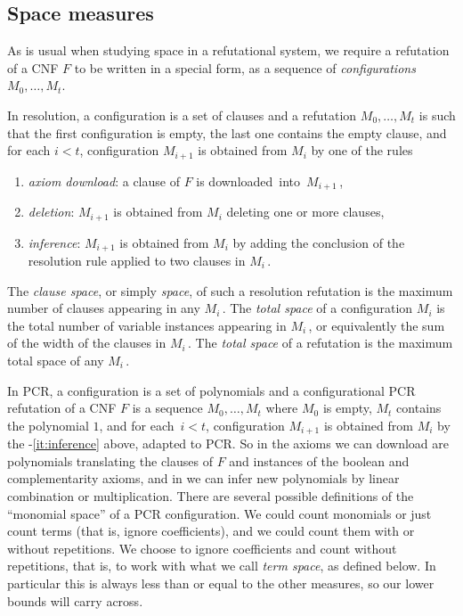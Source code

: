 \subsection{Space measures} \label{sec:space_intro}
As is usual when studying space in a refutational system, we require a  refutation of a CNF $F$  to be 
written in a special form, as 
a sequence of \emph{configurations}  $M_0, \dots, M_t$. 

In resolution, a configuration is a set of clauses and a refutation  $M_0, \dots, M_t$ is such that the first configuration is empty, the last one contains the empty clause,
 and for each $i<t$, configuration 
 $M_{i+1}$ is obtained from $M_{i}$ by one of the rules
\begin{enumerate}[(1)]
\item\label{it:axiom-download}
\emph{axiom download}: a clause of $F$  is downloaded~into~$M_{i+1}$\,,
\item
\emph{deletion}: $M_{i+1}$ is obtained from $M_i$ deleting one or more clauses, 
\item\label{it:inference}
\emph{inference}:  $M_{i+1}$ is obtained from $M_i$ by adding the conclusion of  the  resolution rule applied to two clauses in $M_i$\,.
\end{enumerate}

\begin{definition}
The \emph{clause space}, or simply \emph{space}, of such a resolution refutation
is the maximum number of clauses appearing in any $M_i$\,.
The \emph{total space} of a configuration $M_i$ is the total number of variable instances appearing in $M_i$\,,
or equivalently the sum of the width of the clauses in $M_i$\,. The \emph{total space} of a refutation 
is the maximum total space of any $M_i$\,.
\end{definition}

In PCR, a configuration is a set of polynomials and a configurational PCR refutation of a CNF $F$ is a sequence 
$M_0, \dots, M_t$ where $M_0$ is empty, $M_t$ contains the polynomial $1$, and for each~$i<t$,
configuration 
$M_{i+1}$ is obtained from $M_i$ by
the -\ref{it:inference} above, adapted to PCR.
So in  
the axioms we can download
 are polynomials translating the clauses of $F$ and instances of the boolean and complementarity axioms,
 and in  we can infer new polynomials by linear combination or multiplication.
 There are several possible definitions of the ``monomial space'' of a PCR configuration. 
We could count monomials or just count terms (that is, ignore coefficients),
 and we could count them with or without repetitions.
We choose to ignore coefficients and count without repetitions,
that is, to work with what we call \emph{term space}, as defined below. In
particular this is always less than or equal to the other measures, so our lower bounds will carry across.


